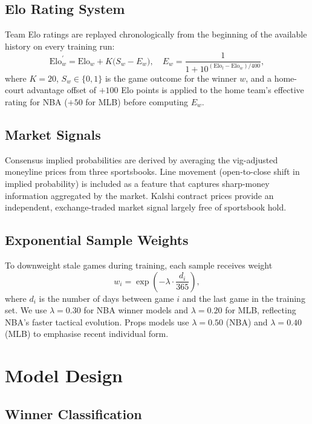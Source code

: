 \documentclass[conference]{IEEEtran}
\begin{document}
\subsection{Elo Rating System}
Team Elo ratings are replayed chronologically from the beginning of the
available history on every training run:
\begin{equation}
\text{Elo}^{\prime}_{w} = \text{Elo}_{w} + K\bigl(S_w - E_w\bigr),
\quad E_w = \frac{1}{1+10^{(\text{Elo}_l - \text{Elo}_w)/400}},
\label{eq:elo}
\end{equation}
where $K{=}20$, $S_w \in \{0,1\}$ is the game outcome for the winner
$w$, and a home-court advantage offset of $+100$ Elo points is applied
to the home team's effective rating for NBA ($+50$ for MLB) before
computing $E_w$.

\subsection{Market Signals}
Consensus implied probabilities are derived by averaging the
vig-adjusted moneyline prices from three sportsbooks.  Line movement
(open-to-close shift in implied probability) is included as a feature
that captures sharp-money information aggregated by the market.
Kalshi contract prices provide an independent, exchange-traded market
signal largely free of sportsbook hold.

\subsection{Exponential Sample Weights}
To downweight stale games during training, each sample receives weight
\begin{equation}
w_i = \exp\!\left(-\lambda\cdot\frac{d_i}{365}\right),
\label{eq:decay}
\end{equation}
where $d_i$ is the number of days between game $i$ and the last game
in the training set.  We use $\lambda{=}0.30$ for NBA winner models and
$\lambda{=}0.20$ for MLB, reflecting NBA's faster tactical evolution.
Props models use $\lambda{=}0.50$ (NBA) and $\lambda{=}0.40$ (MLB)
to emphasise recent individual form.

\section{Model Design}
\label{sec:model}

\subsection{Winner Classification}
\end{document}
